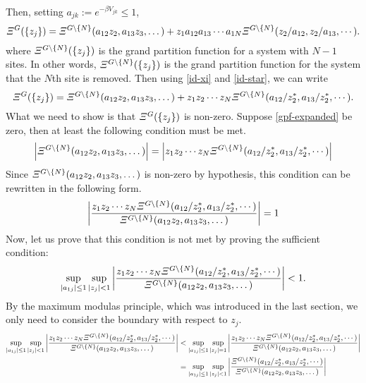 \documentclass[aps, 12pt]{revtex4-2}
\begin{document}
Then, setting $a_{jk} := e^{-\beta V_{jk}} \leq 1$,
\begin{dmath}
  \varXi^{G}(\qty{z_j}) = \varXi^{G\backslash \qty{N}}(a_{12}z_2, a_{13}z_3, \dots) + z_1a_{12}a_{13}\cdots a_{1N}\varXi^{G\backslash \qty{N}}(z_{2}/a_{12}, z_2/a_{13}, \cdots).
\end{dmath}
where $\varXi^{G\backslash \qty{N}}(\qty{z_j})$ is the grand partition function for a system with $N - 1$ sites. In other words, $\varXi^{G\backslash \qty{N}}(\qty{z_j})$ is the grand partition function for the system that the $N$th site is removed. Then using \eqref{id-xi} and \eqref{id-star}, we can write
\begin{dmath}
  \varXi^{G}(\qty{z_j}) = \varXi^{G\backslash \qty{N}}(a_{12}z_2, a_{13}z_3, \dots) + z_1z_2 \cdots z_N\varXi^{G\backslash \qty{N}}(a_{12}/z_{2}^*, a_{13}/z_2^*, \cdots). \label{gpf-expanded}
\end{dmath}
What we need to show is that $\varXi^{G}(\qty{z_j})$ is non-zero. Suppose \eqref{gpf-expanded} be zero, then at least the following condition must be met.
\begin{dmath}
  \qty|\varXi^{G\backslash \qty{N}}(a_{12}z_2, a_{13}z_3, \dots)| = \qty|z_1z_2 \cdots z_N\varXi^{G\backslash \qty{N}}(a_{12}/z_{2}^*, a_{13}/z_2^*, \cdots)|
\end{dmath}
Since $\varXi^{G\backslash \qty{N}}(a_{12}z_2, a_{13}z_3, \dots)$ is non-zero by hypothesis, this condition can be rewritten in the following form.
\begin{dmath}
  \qty|\frac{z_1z_2 \cdots z_N\varXi^{G\backslash \qty{N}}(a_{12}/z_{2}^*, a_{13}/z_2^*, \cdots)}{\varXi^{G\backslash \qty{N}}(a_{12}z_2, a_{13}z_3, \dots)}| = 1 \label{unitcirc}
\end{dmath}
Now, let us prove that this condition is not met by proving the sufficient condition:
\begin{dmath}
  \sup_{\qty|a_{1j}| \leq 1} \sup_{\qty|z_j| < 1} \qty|\frac{z_1z_2 \cdots z_N\varXi^{G\backslash \qty{N}}(a_{12}/z_{2}^*, a_{13}/z_2^*, \cdots)}{\varXi^{G\backslash \qty{N}}(a_{12}z_2, a_{13}z_3, \dots)}| < 1. \label{suffic-con}
\end{dmath}
By the maximum modulas principle, which was introduced in the last section, we only need to consider the boundary with respect to $z_j$.
\begin{align}
  \sup_{\qty|a_{1j}| \leq 1} \sup_{\qty|z_j| < 1} \qty|\frac{z_1z_2 \cdots z_N\varXi^{G\backslash \qty{N}}(a_{12}/z_{2}^*, a_{13}/z_2^*, \cdots)}{\varXi^{G\backslash \qty{N}}(a_{12}z_2, a_{13}z_3, \dots)}| &< \sup_{\qty|a_{1j}| \leq 1} \sup_{\qty|z_j| = 1} \qty|\frac{z_1z_2 \cdots z_N\varXi^{G\backslash \qty{N}}(a_{12}/z_{2}^*, a_{13}/z_2^*, \cdots)}{\varXi^{G\backslash \qty{N}}(a_{12}z_2, a_{13}z_3, \dots)}| \nonumber \\
  &= \sup_{\qty|a_{1j}| \leq 1} \sup_{\qty|z_j| < 1} \qty|\frac{\varXi^{G\backslash \qty{N}}(a_{12}/z_{2}^*, a_{13}/z_2^*, \cdots)}{\varXi^{G\backslash \qty{N}}(a_{12}z_2, a_{13}z_3, \dots)}|
\end{align}
\end{document}
